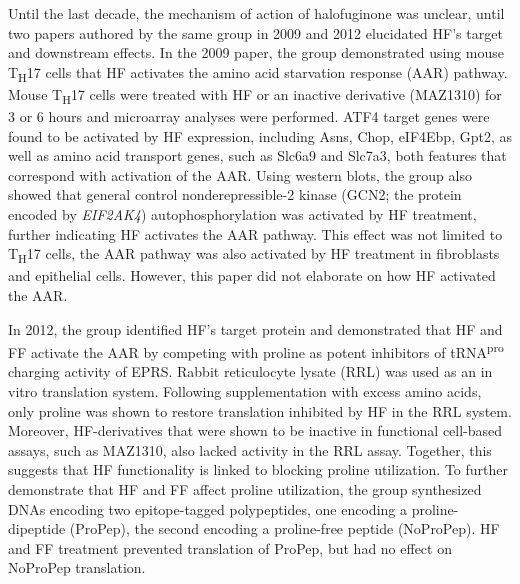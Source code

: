Until the last decade, the mechanism of action of halofuginone was unclear, until two papers authored by the same group in 2009\cite{sundrud2009halofuginone} and 2012\cite{keller2012halofuginone} elucidated HF's target and downstream effects.
In the 2009 paper, the group demonstrated using mouse T\textsubscript{H}17 cells that HF activates the amino acid starvation response (AAR) pathway.
Mouse T\textsubscript{H}17 cells were treated with HF or an inactive derivative (MAZ1310) for 3 or 6 hours and microarray analyses were performed.
ATF4 target genes were found to be activated by HF expression, including Asns, Chop, eIF4Ebp, Gpt2, as well as amino acid transport genes, such as Slc6a9 and Slc7a3, both features that correspond with activation of the AAR\@.
Using western blots, the group also showed that general control nonderepressible-2 kinase (GCN2; the protein encoded by \textit{EIF2AK4}) autophosphorylation was activated by HF treatment, further indicating HF activates the AAR pathway.
This effect was not limited to T\textsubscript{H}17 cells, the AAR pathway was also activated by HF treatment in fibroblasts and epithelial cells\cite{sundrud2009halofuginone}.
However, this paper did not elaborate on how HF activated the AAR\@.

In 2012, the group identified HF's target protein and demonstrated that HF and FF activate the AAR by competing with proline as potent inhibitors of tRNA\textsuperscript{pro} charging activity of EPRS\@.
Rabbit reticulocyte lysate (RRL) was used as an in vitro translation system.
Following supplementation with excess amino acids, only proline was shown to restore translation inhibited by HF in the RRL system.
Moreover, HF-derivatives that were shown to be inactive in functional cell-based assays, such as MAZ1310, also lacked activity in the RRL assay.
Together, this suggests that HF functionality is linked to blocking proline utilization.
To further demonstrate that HF and FF affect proline utilization, the group synthesized DNAs encoding two epitope-tagged polypeptides, one encoding a proline-dipeptide (ProPep), the second encoding a proline-free peptide (NoProPep).
HF and FF treatment prevented translation of ProPep, but had no effect on NoProPep translation\cite{keller2012halofuginone}.

